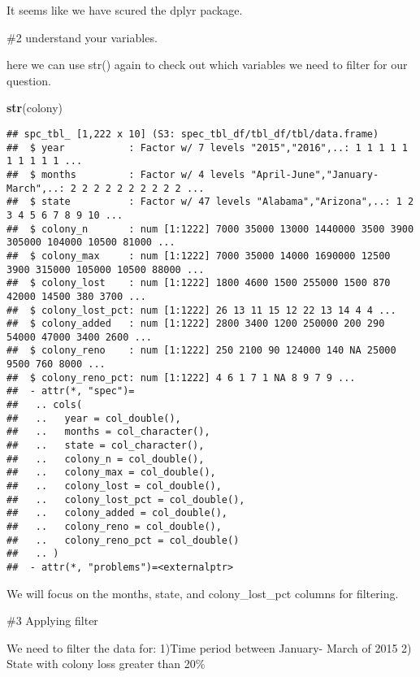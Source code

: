 \documentclass[
]{article}
\newenvironment{Shaded}{\begin{snugshade}}{\end{snugshade}}
\newcommand{\FunctionTok}[1]{\textcolor[rgb]{0.13,0.29,0.53}{\textbf{#1}}}
\newcommand{\NormalTok}[1]{#1}
\begin{document}
It seems like we have scured the dplyr package.

\#2 understand your variables.

here we can use str() again to check out which variables we need to
filter for our question.

\begin{Shaded}
\begin{Highlighting}[]
\FunctionTok{str}\NormalTok{(colony)}
\end{Highlighting}
\end{Shaded}

\begin{verbatim}
## spc_tbl_ [1,222 x 10] (S3: spec_tbl_df/tbl_df/tbl/data.frame)
##  $ year           : Factor w/ 7 levels "2015","2016",..: 1 1 1 1 1 1 1 1 1 1 ...
##  $ months         : Factor w/ 4 levels "April-June","January-March",..: 2 2 2 2 2 2 2 2 2 2 ...
##  $ state          : Factor w/ 47 levels "Alabama","Arizona",..: 1 2 3 4 5 6 7 8 9 10 ...
##  $ colony_n       : num [1:1222] 7000 35000 13000 1440000 3500 3900 305000 104000 10500 81000 ...
##  $ colony_max     : num [1:1222] 7000 35000 14000 1690000 12500 3900 315000 105000 10500 88000 ...
##  $ colony_lost    : num [1:1222] 1800 4600 1500 255000 1500 870 42000 14500 380 3700 ...
##  $ colony_lost_pct: num [1:1222] 26 13 11 15 12 22 13 14 4 4 ...
##  $ colony_added   : num [1:1222] 2800 3400 1200 250000 200 290 54000 47000 3400 2600 ...
##  $ colony_reno    : num [1:1222] 250 2100 90 124000 140 NA 25000 9500 760 8000 ...
##  $ colony_reno_pct: num [1:1222] 4 6 1 7 1 NA 8 9 7 9 ...
##  - attr(*, "spec")=
##   .. cols(
##   ..   year = col_double(),
##   ..   months = col_character(),
##   ..   state = col_character(),
##   ..   colony_n = col_double(),
##   ..   colony_max = col_double(),
##   ..   colony_lost = col_double(),
##   ..   colony_lost_pct = col_double(),
##   ..   colony_added = col_double(),
##   ..   colony_reno = col_double(),
##   ..   colony_reno_pct = col_double()
##   .. )
##  - attr(*, "problems")=<externalptr>
\end{verbatim}

We will focus on the months, state, and colony\_lost\_pct columns for
filtering.

\#3 Applying filter

We need to filter the data for: 1)Time period between January- March of
2015 2) State with colony loss greater than 20\%
\end{document}
